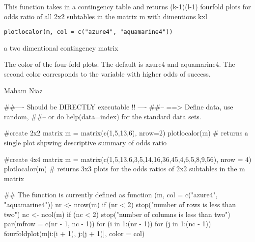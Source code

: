 \documentclass[letterpaper]{book}
\begin{document}
%
\begin{Description}\relax
This function takes in a contingency table and returns (k-1)(l-1) fourfold plots for odds ratio of all 2x2 subtables in the matrix 
m with dimentions kxl 
\end{Description}
%
\begin{Usage}
\begin{verbatim}
plotlocalor(m, col = c("azure4", "aquamarine4"))
\end{verbatim}
\end{Usage}
%
\begin{Arguments}
\begin{ldescription}
\item[\code{m}] 
a two dimentional contingency matrix

\item[\code{col}] 
The color of the four-fold plots. The default is azure4 and aquamarine4. The second color corresponds to the 
variable with higher odds of success.

\end{ldescription}
\end{Arguments}
%
\begin{Author}\relax
Maham Niaz
\end{Author}
%
\begin{Examples}
\begin{ExampleCode}
##---- Should be DIRECTLY executable !! ----
##-- ==>  Define data, use random,
##--	or do  help(data=index)  for the standard data sets.

  #create 2x2 matrix
  m = matrix(c(1,5,13,6), nrow=2)
  plotlocalor(m) # returns a single plot shpwing descriptive summary of odds ratio
  
  #create 4x4 matrix
  m = matrix(c(1,5,13,6,3,5,14,16,36,45,4,6,5,8,9,56), nrow = 4)
  plotlocalor(m) # returns 3x3 plots for the odds ratios of 2x2 subtables in the m matrix
  
## The function is currently defined as
function (m, col = c("azure4", "aquamarine4")) 
{
    nr <- nrow(m)
    if (nr < 2) 
        stop("number of rows is less than two")
    nc <- ncol(m)
    if (nc < 2) 
        stop("number of columns is less than two")
    par(mfrow = c(nr - 1, nc - 1))
    for (i in 1:(nr - 1)) for (j in 1:(nc - 1)) {
        fourfoldplot(m[i:(i + 1), j:(j + 1)], color = col)
    }
  }
\end{ExampleCode}
\end{Examples}
\printindex{}
\end{document}
